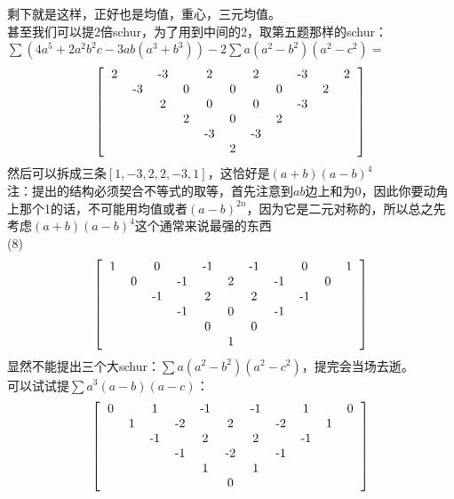 \documentclass[UTF8]{ctexart}
\begin{document}
剩下就是这样，正好也是均值，重心，三元均值。\\
甚至我们可以提2倍schur，为了用到中间的2，取第五题那样的schur：\\
$ \displaystyle \sum (4a^{5}+2a^{2}b^{2}c-3ab(a^{3}+b^{3}))-
 2\displaystyle \sum a(a^{2}-b^{2})(a^{2}-c^{2})=$
 \renewcommand*{\arraystretch}{1.732}\[\left[\begin{matrix}
 	\begin{tabular}{ccccccccccccc}
 		2& &-3& &2& &2& &-3& &2\\
 		&-3& &0& &0& &0& &2&\\
 		& &2& &0& &0& &-3& &\\
 		& & &2& &0& &2& & &\\
 		& & & &-3& &-3& & & &\\
 		& & & & &2& & & & &\\
 	\end{tabular}
 \end{matrix}\right]\]
然后可以拆成三条$ [1,-3,2,2,-3,1] $，这恰好是$ (a+b)(a-b)^{4}$\\
注：提出的结构必须契合不等式的取等，首先注意到$ ab $边上和为$ 0 $，因此你要动角上那个1的话，不可能用均值或者$ (a-b)^{2n} $，因为它是二元对称的，所以总之先考虑$ (a+b)(a-b)^{4}$这个通常来说最强的东西\\
(8)\renewcommand*{\arraystretch}{1.732}\[\left[\begin{matrix}
	\begin{tabular}{ccccccccccccc}
		1& &0& &-1& &-1& &0& &1\\
		&0& &-1& &2& &-1& &0&\\
		& &-1& &2& &2& &-1& &\\
		& & &-1& &0& &-1& & &\\
		& & & &0& &0& & & &\\
		& & & & &1& & & & &\\
	\end{tabular}
\end{matrix}\right]\]
显然不能提出三个大schur：$ \displaystyle \sum a(a^{2}-b^{2})(a^{2}-c^{2}) $，提完会当场去逝。\\
可以试试提$ \displaystyle \sum a^{3}(a-b)(a-c) $：
\renewcommand*{\arraystretch}{1.732}\[\left[\begin{matrix}
	\begin{tabular}{ccccccccccccc}
		0& &1& &-1& &-1& &1& &0\\
		&1& &-2& &2& &-2& &1&\\
		& &-1& &2& &2& &-1& &\\
		& & &-1& &-2& &-1& & &\\
		& & & &1& &1& & & &\\
		& & & & &0& & & & &\\
	\end{tabular}
\end{matrix}\right]\]
\end{document}

